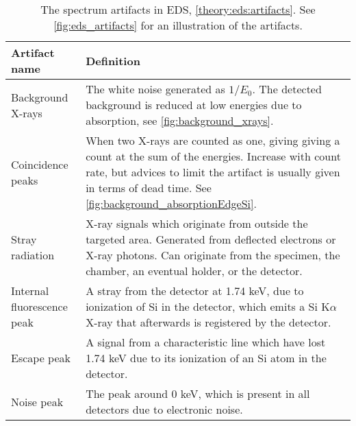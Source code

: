 \begin{table}[hbtp]
    \begin{center}
        \caption{
            The spectrum artifacts in EDS, \cref{theory:eds:artifacts}.
            See \cref{fig:eds_artifacts} for an illustration of the artifacts.
        }
        \renewcommand*{\arraystretch}{1.4}
        \label{tab:eds_artifacts}
        \begin{tabular}{p{4cm}p{10.6cm}}
            \hline
            \textbf{Artifact name}     & \textbf{Definition}                                                                                                                                                                                                                   \\
            \hline
            Background X-rays          & The white noise generated as $1/E_0$. The detected background is reduced at low energies due to absorption, see \cref{fig:background_xrays}.                                                                                          \\
            Coincidence peaks          & When two X-rays are counted as one, giving giving a count at the sum of the energies. Increase with count rate, but advices to limit the artifact is usually given in terms of dead time. See \cref{fig:background_absorptionEdgeSi}. \\
            Stray radiation            & X-ray signals which originate from outside the targeted area. Generated from deflected electrons or X-ray photons. Can originate from the specimen, the chamber, an eventual holder, or the detector.                                 \\
            Internal fluorescence peak & A stray from the detector at 1.74 keV, due to ionization of Si in the detector, which emits a Si K$\alpha$ X-ray that afterwards is registered by the detector.                                                                       \\
            Escape peak                & A signal from a characteristic line which have lost 1.74 keV due to its ionization of an Si atom in the detector.                                                                                                                     \\
            Noise peak                 & The peak around 0 keV, which is present in all detectors due to electronic noise.                                                                                                                                                     \\
            \hline
        \end{tabular}
    \end{center}
\end{table}